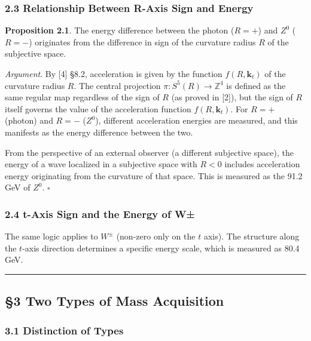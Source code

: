\documentclass[
  a4paper,11pt]{article}
\theoremstyle{definition}
\theoremstyle{remark}
\begin{document}
\subsubsection{2.3 Relationship Between R-Axis Sign and
Energy}\label{relationship-between-r-axis-sign-and-energy}

\textbf{Proposition 2.1}. The energy difference between the photon
(\(R = +\)) and \(Z^0\) (\(R = -\)) originates from the difference in
sign of the curvature radius \(R\) of the subjective space.

\emph{Argument}. By {[}4{]} §8.2, acceleration is given by the function
\(f(R, \mathbf{k}_t)\) of the curvature radius \(R\). The central
projection \(\pi: S^5(R) \to \mathbb{Z}^4\) is defined as the same
regular map regardless of the sign of \(R\) (as proved in {[}2{]}), but
the sign of \(R\) itself governs the value of the acceleration function
\(f(R, \mathbf{k}_t)\). For \(R = +\) (photon) and \(R = -\) (\(Z^0\)),
different acceleration energies are measured, and this manifests as the
energy difference between the two.

From the perspective of an external observer (a different subjective
space), the energy of a wave localized in a subjective space with
\(R < 0\) includes acceleration energy originating from the curvature of
that space. This is measured as the 91.2 GeV of \(Z^0\). \(\square\)

\subsubsection{2.4 t-Axis Sign and the Energy of
W±}\label{t-axis-sign-and-the-energy-of-w}

The same logic applies to \(W^{\pm}\) (non-zero only on the \(t\) axis).
The structure along the \(t\)-axis direction determines a specific
energy scale, which is measured as 80.4 GeV.

\begin{center}\rule{0.5\linewidth}{0.5pt}\end{center}

\subsection{§3 Two Types of Mass
Acquisition}\label{two-types-of-mass-acquisition}

\subsubsection{3.1 Distinction of Types}\label{distinction-of-types}
\end{document}
